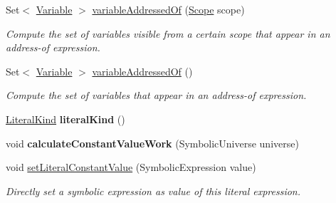 \begin{DoxyCompactItemize}
\item 
Set$<$ \hyperlink{interfaceedu_1_1udel_1_1cis_1_1vsl_1_1civl_1_1model_1_1IF_1_1variable_1_1Variable}{Variable} $>$ \hyperlink{classedu_1_1udel_1_1cis_1_1vsl_1_1civl_1_1model_1_1common_1_1expression_1_1CommonCharLiteralExpression_ad6a8e79f6c8a33a4cb27d7a2797da0ee}{variable\+Addressed\+Of} (\hyperlink{interfaceedu_1_1udel_1_1cis_1_1vsl_1_1civl_1_1model_1_1IF_1_1Scope}{Scope} scope)
\begin{DoxyCompactList}\small\item\em Compute the set of variables visible from a certain scope that appear in an address-\/of expression. \end{DoxyCompactList}\item 
Set$<$ \hyperlink{interfaceedu_1_1udel_1_1cis_1_1vsl_1_1civl_1_1model_1_1IF_1_1variable_1_1Variable}{Variable} $>$ \hyperlink{classedu_1_1udel_1_1cis_1_1vsl_1_1civl_1_1model_1_1common_1_1expression_1_1CommonCharLiteralExpression_a9edc3252aa5c69ab7d71bc20d037da38}{variable\+Addressed\+Of} ()
\begin{DoxyCompactList}\small\item\em Compute the set of variables that appear in an address-\/of expression. \end{DoxyCompactList}\item 
\hypertarget{classedu_1_1udel_1_1cis_1_1vsl_1_1civl_1_1model_1_1common_1_1expression_1_1CommonCharLiteralExpression_a9a9aa4b36b6e00e583410f19dfdae8da}{}\hyperlink{enumedu_1_1udel_1_1cis_1_1vsl_1_1civl_1_1model_1_1IF_1_1expression_1_1LiteralExpression_1_1LiteralKind}{Literal\+Kind} {\bfseries literal\+Kind} ()\label{classedu_1_1udel_1_1cis_1_1vsl_1_1civl_1_1model_1_1common_1_1expression_1_1CommonCharLiteralExpression_a9a9aa4b36b6e00e583410f19dfdae8da}

\item 
\hypertarget{classedu_1_1udel_1_1cis_1_1vsl_1_1civl_1_1model_1_1common_1_1expression_1_1CommonCharLiteralExpression_a758f38d51e13dab505f03dfd7f665012}{}void {\bfseries calculate\+Constant\+Value\+Work} (Symbolic\+Universe universe)\label{classedu_1_1udel_1_1cis_1_1vsl_1_1civl_1_1model_1_1common_1_1expression_1_1CommonCharLiteralExpression_a758f38d51e13dab505f03dfd7f665012}

\item 
void \hyperlink{classedu_1_1udel_1_1cis_1_1vsl_1_1civl_1_1model_1_1common_1_1expression_1_1CommonCharLiteralExpression_a603c66d24efd93c6af8d2684142084b1}{set\+Literal\+Constant\+Value} (Symbolic\+Expression value)
\begin{DoxyCompactList}\small\item\em Directly set a symbolic expression as value of this literal expression. \end{DoxyCompactList}\end{DoxyCompactItemize}
